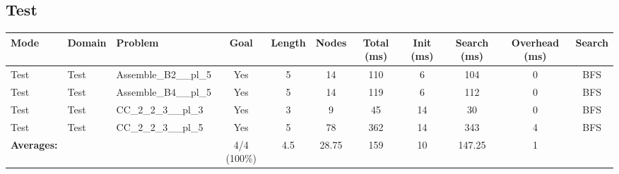\documentclass{article}
\begin{document}
\subsection*{Test}
\begin{tabular}{lllcccccccc}
\toprule
Mode & Domain & Problem & Goal & Length & Nodes & Total (ms) & Init (ms) & Search (ms) & Overhead (ms) & Search \\
\midrule
Test & Test & Assemble\_B2\_\_pl\_5 & Yes & 5 & 14 & 110 & 6 & 104 & 0 & BFS \\
Test & Test & Assemble\_B4\_\_pl\_5 & Yes & 5 & 14 & 119 & 6 & 112 & 0 & BFS \\
Test & Test & CC\_2\_2\_3\_\_pl\_3 & Yes & 3 & 9 & 45 & 14 & 30 & 0 & BFS \\
Test & Test & CC\_2\_2\_3\_\_pl\_5 & Yes & 5 & 78 & 362 & 14 & 343 & 4 & BFS \\
\textbf{Averages:} & & & 4/4 (100\%) & 4.5 & 28.75 & 159 & 10 & 147.25 & 1 & \\
\bottomrule
\end{tabular}
\newpage
\end{document}
